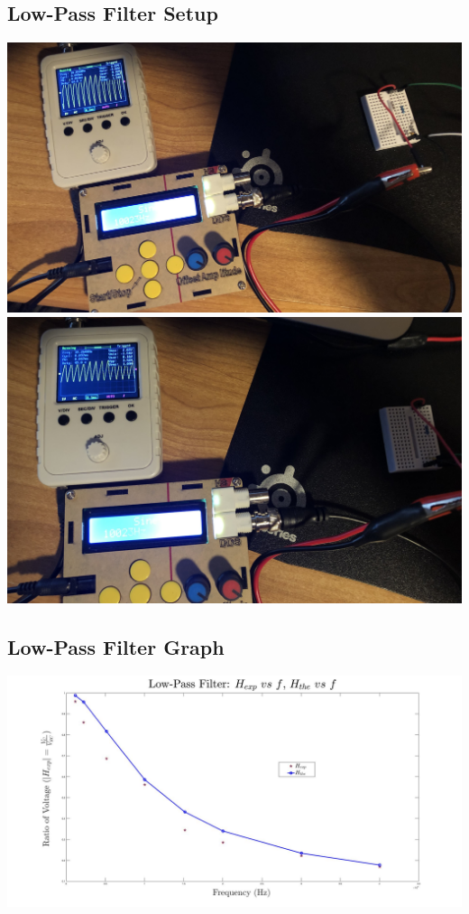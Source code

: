 \documentclass{article}
\begin{document}
\begin{center}
  \subsection*{Low-Pass Filter Setup}
  \includegraphics[scale=0.064]{Vcr.jpeg}
  \includegraphics[scale=0.06]{Vc.jpeg}
\end{center}

\begin{center}
  \subsection*{Low-Pass Filter Graph}
  \includegraphics[scale=0.2]{graph2.jpg}
\end{center}
\end{document}
